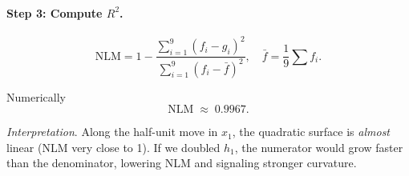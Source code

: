 {\begin{enumerate}[a)]
\paragraph{Step 3: Compute \(R^2\).}
\[
  \text{NLM}=1-\frac{\sum_{i=1}^{9}(f_i-g_i)^2}%
                     {\sum_{i=1}^{9}(f_i-\bar f)^2},
  \quad
  \bar f=\frac1{9}\sum f_i.
\]

Numerically  
\[
  \boxed{\text{NLM}\;\approx\;0.9967}.
\]

\emph{Interpretation}.  
Along the half-unit move in \(x_1\), the quadratic surface is
\emph{almost} linear (NLM very close to 1).  
If we doubled \(h_1\), the numerator would grow faster than the denominator,
lowering NLM and signaling stronger curvature.

\end{enumerate}

}

